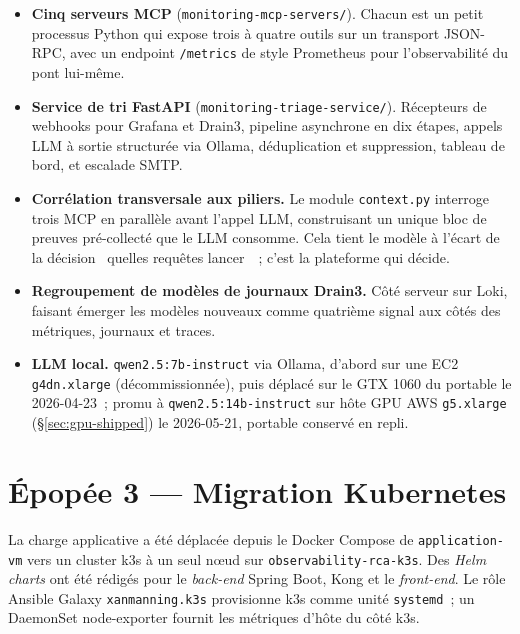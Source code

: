 \documentclass[11pt,a4paper,oneside]{report}
\begin{document}
\begin{itemize}
  \item \textbf{Cinq serveurs MCP}
        (\texttt{monitoring-mcp-servers/}). Chacun est un petit
        processus Python qui expose trois à quatre outils sur un
        transport JSON-RPC, avec un endpoint \texttt{/metrics} de
        style Prometheus pour l'observabilité du pont lui-même.
  \item \textbf{Service de tri FastAPI}
        (\texttt{monitoring-triage-service/}). Récepteurs de
        webhooks pour Grafana et Drain3, pipeline asynchrone en dix
        étapes, appels LLM à sortie structurée via Ollama,
        déduplication et suppression, tableau de bord, et escalade
        SMTP.
  \item \textbf{Corrélation transversale aux piliers.} Le module
        \texttt{context.py} interroge trois MCP en parallèle avant
        l'appel LLM, construisant un unique bloc de preuves
        pré-collecté que le LLM consomme. Cela tient le modèle à
        l'écart de la décision \og~quelles requêtes lancer~\fg{}~;
        c'est la plateforme qui décide.
  \item \textbf{Regroupement de modèles de journaux Drain3.} Côté
        serveur sur Loki, faisant émerger les modèles nouveaux
        comme quatrième signal aux côtés des métriques, journaux et
        traces.
  \item \textbf{LLM local.} \texttt{qwen2.5:7b-instruct} via Ollama,
        d'abord sur une EC2 \texttt{g4dn.xlarge} (décommissionnée),
        puis déplacé sur le GTX 1060 du portable le 2026-04-23~;
        promu à \texttt{qwen2.5:14b-instruct} sur hôte GPU AWS
        \texttt{g5.xlarge} (\S\ref{sec:gpu-shipped}) le 2026-05-21,
        portable conservé en repli.
\end{itemize}

\section{Épopée 3 --- Migration Kubernetes}

La charge applicative a été déplacée depuis le Docker Compose de
\texttt{application-vm} vers un cluster k3s à un seul n\oe{}ud sur
\texttt{observability-rca-k3s}. Des \emph{Helm charts} ont été
rédigés pour le \emph{back-end} Spring Boot, Kong et le
\emph{front-end}. Le rôle Ansible Galaxy
\texttt{xanmanning.k3s} provisionne k3s comme unité
\texttt{systemd}~; un DaemonSet node-exporter fournit les métriques
d'hôte du côté k3s.
\end{document}
